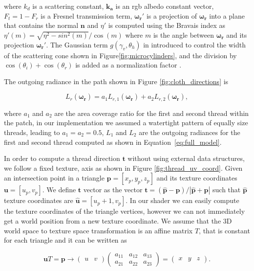\documentclass[12pt]{article}
\newcommand{\omegar}{\boldsymbol{\omega_r}}
\newcommand{\tb}{\mathbf{t}}
\begin{document}
where $k_d$ is a scattering constant, $\mathbf{k_a}$ is an rgb albedo constant vector, $F_t = 1 - F_r$ is a Fresnel transmission term, $\omegar'$ is a projection of $\omegar$ into a plane that contains the normal $\mathbf{n}$ and $\eta'$ is computed using the Bravais index \cite{Marschner2003} as $\eta'(m) = \sqrt{\eta^2 - sin^2(m)}  / \cos(m)$ where $m$ is the angle between $\omegar$ and its projection $\omegar'$.
The Gaussian term $g(\gamma_v, \theta_h)$ in introduced to control the width of the scattering cone shown in Figure\ref{fig:microcylinders}, and the division by $\cos(\theta_i) + \cos(\theta_r)$ is added as a normalization factor \cite{chandrasekhar2013}.

The outgoing radiance in the path shown in Figure \ref{fig:cloth_directions} is

\begin{equation}
L_r(\omegar) = a_1 L_{r,1}(\omegar) + a_2 L_{r,2}(\omegar),
\end{equation}

where $a_1$ and $a_2$ are the area coverage ratio for the first and second thread within the patch, in our implementation we assumed a watertight pattern of equally size threads, leading to $a_1 = a_2 = 0.5$, $L_1$ and $L_2$ are the outgoing radiances for the first and second thread computed as shown in Equation~\ref{eq:full_model}.

In order to compute a thread direction $\tb$ without using external data structures, we follow a fixed texture, axis as shown in Figure \ref{fig:thread_uv_coord}.
Given an intersection point in a triangle $\mathbf{p} = \left[ x_p, y_p,z_p \right]$ and its texture coordinates $\mathbf{u} = \left[ u_p, v_p \right]$.
We define $\tb$ vector as the vector $\tb = (\hat{\mathbf{p}} - \mathbf{p})/ \left|\hat{\mathbf{p}} + \mathbf{p} \right|$ such that $\hat{\mathbf{p}}$ texture coordinates are $\hat{\mathbf{u}} = \left[ u_p + 1, v_p \right]$.
In our shader we can easily compute the texture coordinates of the triangle vertices, however we can not immediately get a world position from a new texture coordinate.
We assume that the 3D world space to texture space transformation is an affine matrix $T$, that is constant for each triangle and it can be written as

\begin{equation}
\mathbf{u} T = \mathbf{p} \rightarrow
\begin{pmatrix}
u & v
\end{pmatrix}
\begin{pmatrix}
a_{11} & a_{12} & a_{13} \\
a_{21} & a_{22} & a_{23}
\end{pmatrix} =
\begin{pmatrix}
x & y & z
\end{pmatrix}.
\label{eq:uv_to_3d}
\end{equation}
\end{document}
